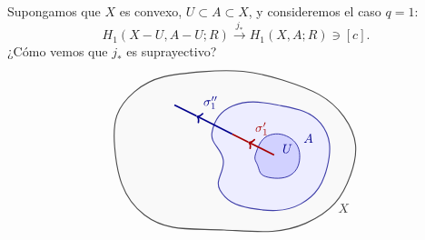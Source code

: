 \begin{ejemplo}
Supongamos que $X$ es convexo, $U \subset A \subset X$, y consideremos el caso $q = 1$:
\[
H_1(X - U, A - U; R) \xrightarrow{\;j_*\;} H_1(X, A; R) \ni [c].
\]
¿Cómo vemos que $j_*$ es suprayectivo?
\[
\begin{tikzpicture}[baseline=(current bounding box.center), scale=0.92]
    \draw[thick, black!70, fill=gray!5] plot[smooth cycle, tension=0.75] coordinates {
        (-3.15,  0.30)
        (-2.55,  1.95)
        (-0.50,  2.55)
        ( 1.90,  2.30)
        ( 3.75,  1.20)
        ( 3.95, -0.55)
        ( 2.60, -2.00)
        ( 0.15, -2.20)
        (-2.25, -1.75)
    };

    \draw[thick, blue!55!black!75, fill=blue!7] plot[smooth cycle, tension=0.75] coordinates {
        (-0.22,  0.72)
        ( 0.40,  1.52)
        ( 1.75,  1.55)
        ( 3.05,  1.00)
        ( 3.25, -0.30)
        ( 2.45, -1.42)
        ( 0.95, -1.55)
        ( 0.02, -1.00)
        ( 0.12, -0.10)
    };

    \draw[semithick, blue!55!black!90, fill=blue!18] plot[smooth cycle, tension=0.75] coordinates {
        ( 1.10,  0.10)
        ( 1.45,  0.62)
        ( 2.10,  0.58)
        ( 2.42,  0.05)
        ( 2.15, -0.55)
        ( 1.40, -0.60)
        ( 1.15, -0.25)
    };

    \node[black!80]      at (3.75, -1.55) {$X$};
    \node[blue!55!black] at (2.68,  0.55) {$A$};
    \node[blue!55!black] at (2.05,  0.24) {$U$};

    \coordinate (W0) at ( 1.65,  0.05);
    \coordinate (W2) at ( 0.39,  0.68);
    \coordinate (W1) at (-1.35,  1.55);
    \coordinate (V2) at (-2.30,  0.05);
    \coordinate (V3) at (-1.45, -1.30);
    \coordinate (V4) at ( 0.75, -0.95);

    \draw[->, very thick, red!65!black] (W0) -- (0.869, 0.4405);
    \draw[very thick, red!65!black] (0.869, 0.4405) -- (W2);
    \node[red!65!black, above right=2pt] at (0.87, 0.44) {$\sigma_1'$};

    \draw[->, very thick, blue!55!black] (W2) -- (-0.689, 1.2195);
    \draw[very thick, blue!55!black] (-0.689, 1.2195) -- (W1);
    \node[blue!55!black, above right=2pt] at (-0.69, 1.22) {$\sigma_1''$};


\end{tikzpicture}\]
\end{ejemplo}
